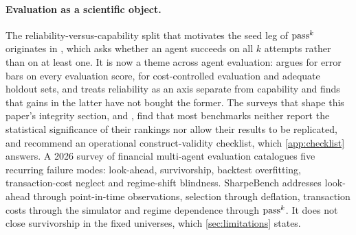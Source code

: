 \paragraph{Evaluation as a scientific object.} The reliability-versus-capability split that motivates the seed leg of $\text{pass}^{k}$ originates in \citet{taubench2025}, which asks whether an agent succeeds on all $k$ attempts rather than on at least one. It is now a theme across agent evaluation: \citet{miller2024errorbars} argues for error bars on every evaluation score, \citet{kapoor2024agents} for cost-controlled evaluation and adequate holdout sets, and \citet{agentreliability2026} treats reliability as an axis separate from capability and finds that gains in the latter have not bought the former. The surveys that shape this paper's integrity section, \citet{betterbench2024} and \citet{constructvalidity2025}, find that most benchmarks neither report the statistical significance of their rankings nor allow their results to be replicated, and recommend an operational construct-validity checklist, which \cref{app:checklist} answers. A 2026 survey of financial multi-agent evaluation \citep{finmultiagentsurvey2026} catalogues five recurring failure modes: look-ahead, survivorship, backtest overfitting, transaction-cost neglect and regime-shift blindness. SharpeBench addresses look-ahead through point-in-time observations, selection through deflation, transaction costs through the simulator and regime dependence through $\text{pass}^{k}$. It does not close survivorship in the fixed universes, which \cref{sec:limitations} states.
